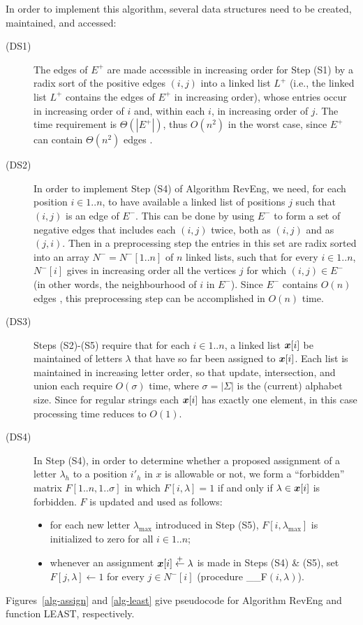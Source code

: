 \documentclass[runningheads,a4paper]{llncs}
\def\s#1{\mbox{\boldmath $#1$}}
\def\la{\leftarrow}
\def\UPDATE\_F{\tt{UPDATE\_F}}
\begin{document}
In order to implement this algorithm, several data structures need
to be created, maintained, and accessed:


\begin{description}
\item[(DS1)]
The edges of $E^+$ are made accessible in increasing order for Step (S1) by
a radix sort of the positive edges $(i,j)$ into a linked list $L^+$ (i.e., the linked list $L^+$ contains the edges of $E^+$ in increasing order),
whose entries occur in increasing order of $i$ and, within each $i$,
in increasing order of $j$.
The time requirement is $\Theta(|E^+|)$, thus $O(n^2)$ in the worst case,
since $E^+$ can contain $\Theta(n^2)$ edges \cite{CRSW13}.
\item[(DS2)]
In order to implement Step (S4) of Algorithm RevEng, we need,
for each position $i \in 1..n$, to have available a linked list of positions
$j$ such that $(i,j)$ is an edge of $E^-$.
This can be done by using $E^-$ to form a set of negative edges that includes
each $(i,j)$ twice, both as $(i,j)$ and as $(j,i)$.
Then in a preprocessing step the entries in this set are radix sorted
into an array $N^- = N^-[1..n]$ of $n$ linked lists, such that for every $i \in 1..n$,
$N^-[i]$ gives in increasing order all the vertices $j$
for which $(i,j) \in E^-$
(in other words, the neighbourhood of $i$ in $E^-$).
Since $E^-$ contains $O(n)$ edges \cite{CRSW13},
this preprocessing step can be accomplished in $O(n)$ time.
\item[(DS3)]
Steps (S2)-(S5) require that for each $i \in 1..n$,
a linked list $\s{x}[i]$ be maintained of letters $\lambda$
that have so far been assigned to $\s{x}[i]$.
Each list is maintained in increasing letter order,
so that update, intersection, and union each require $O(\sigma)$ time,
where $\sigma = |\Sigma|$ is the (current) alphabet size.
Since for regular strings each $\s{x}[i]$ has exactly one element,
in this case processing time reduces to $O(1)$.
\item[(DS4)]
In Step (S4), in order to determine whether a proposed assignment
of a letter $\lambda_h$ to a position $i'_h$ in \s{x} is allowable or not,
we form a ``forbidden'' matrix $F[1..n,1..\sigma]$ in which
$F[i,\lambda] = 1$ if and only if $\lambda \in \s{x}[i]$ is forbidden.
$F$ is updated and used as follows:
\begin{itemize}
\item
for each new letter $\lambda_{\max}$ introduced in Step (S5),
$F[i,\lambda_{\max}]$ is initialized to zero for all $i \in 1..n$;
\item
whenever an assignment $\s{x}[i] \stackrel{+}{\la} \lambda$
is made in Steps (S4) \& (S5), set
$F[j,\lambda] \la 1$ for every $j \in N^-[i]$
(procedure \UPDATE\_F$(i,\lambda)$).
\end{itemize}
\end{description}
Figures~\ref{alg-assign} and \ref{alg-least} give pseudocode
for Algorithm RevEng and function LEAST, respectively.
\end{document}

